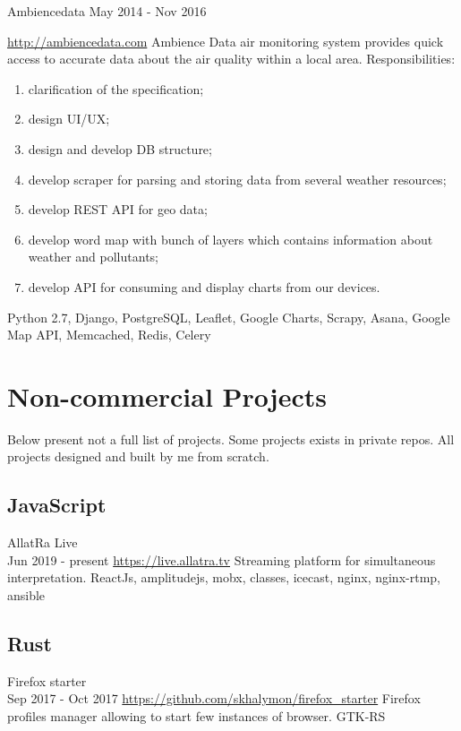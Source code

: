 \documentclass[11pt,a4paper]{moderncv}
\begin{document}
	\cvline
	{Ambiencedata May 2014 - Nov 2016}
	{\url{http://ambiencedata.com}\newline{}
		Ambience Data air monitoring system provides quick access to accurate data about the air quality within a local area.\newline{}
		Responsibilities: 
		    \begin{enumerate}
		        \item clarification of the specification;
		        \item design UI/UX;
		        \item design and develop DB structure;
		        \item develop scraper for parsing and storing data from several weather resources;
		        \item develop REST API for geo data;
		        \item develop word map with bunch of layers which contains information about weather and pollutants;
		        \item develop API for consuming and display charts from our devices.
		    \end{enumerate}
		\newline{}\newline{}
		Python 2.7, Django, PostgreSQL, Leaflet, Google Charts, Scrapy, Asana, Google Map API, Memcached, Redis, Celery}


	\section{Non-commercial Projects}
    Below present not a full list of projects. Some projects exists in private repos. All projects designed and built by me from scratch.

	\subsection{JavaScript}
	\cvline
	{AllatRa Live\\ Jun 2019 - present}
	{\url{https://live.allatra.tv}\newline{}
		Streaming platform for simultaneous interpretation.\newline{}
		ReactJs, amplitudejs, mobx, classes, icecast, nginx, nginx-rtmp, ansible}
	
	\subsection{Rust}
    \cvline
	{Firefox starter\\ Sep 2017 - Oct 2017}
	{\url{https://github.com/skhalymon/firefox_starter}\newline{}
		Firefox profiles manager allowing to start few instances of browser.\newline{}
		GTK-RS}
\end{document}
